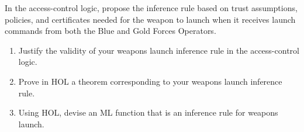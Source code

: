 

\begin{exercise}[\synthesis]
  In the access-control logic, propose the inference rule based on
  trust assumptions, policies, and certificates needed for the weapon
  to launch when it receives launch commands from both the Blue and
  Gold Forces Operators.
  \begin{enumerate}[{A.}]
  \item Justify the validity of your weapons launch inference rule in
    the access-control logic.
  \item Prove in HOL a theorem corresponding to your weapons launch
    inference rule.
  \item Using HOL, devise an ML function that is an inference rule for
    weapons launch.
  \end{enumerate}
\end{exercise}

